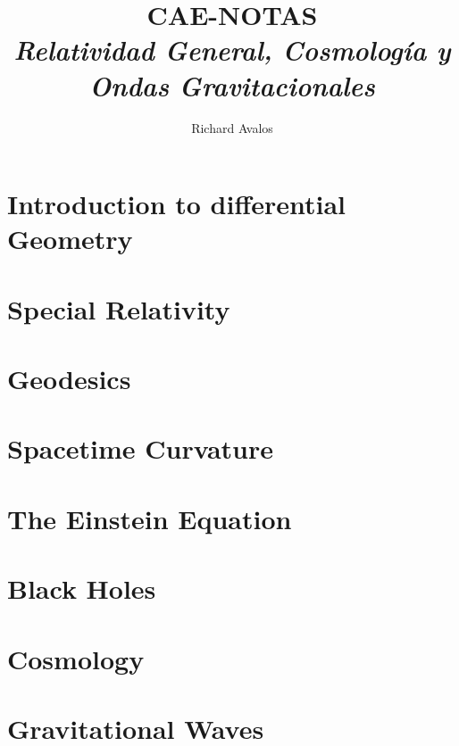 \documentclass[11pt]{article}
\begin{document}
	\title{{CAE-NOTAS}\\{\normalsize{\itshape Relatividad General, Cosmología y Ondas Gravitacionales}}}
	\author{Richard Avalos}
	\maketitle
	\newpage
 
	\pagestyle{fancynotes}

        \part{Introduction to differential Geometry}
        

        \part{Special Relativity}
        

        \part{Geodesics}
        

        \part{Spacetime Curvature}
        

        \part{The Einstein Equation}
        

        \part{Black Holes}
        

        \part{Cosmology}
        

        \part{Gravitational Waves}
        
\end{document}
